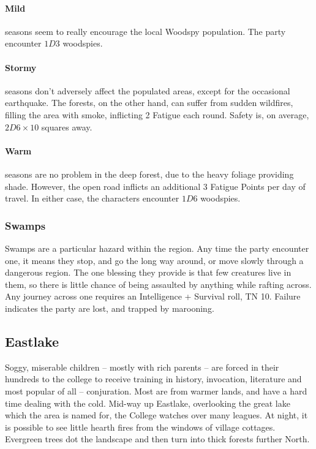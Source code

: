 \begin{multicols}{2}
\paragraph{Mild} seasons seem to really encourage the local Woodspy population.
The party encounter $1D3$ woodspies.
\paragraph{Stormy} seasons don't adversely affect the populated areas, except for the occasional earthquake.
The forests, on the other hand, can suffer from sudden wildfires, filling the area with smoke, inflicting 2 Fatigue each round.
Safety is, on average, $2D6 \times 10$ squares away.
\paragraph{Warm} seasons are no problem in the deep forest, due to the heavy foliage providing shade.
However, the open road inflicts an additional 3 Fatigue Points per day of travel.
In either case, the characters encounter $1D6$ woodspies.

\subsubsection{Swamps}

Swamps are a particular hazard within the region.
Any time the party encounter one, it means they stop, and go the long way around, or move slowly through a dangerous region.
The one blessing they provide is that few creatures live in them, so there is little chance of being assaulted by anything while rafting across.
Any journey across one requires an Intelligence + Survival roll, TN 10.
Failure indicates the party are lost, and trapped by marooning.

\subsection{Eastlake}


Soggy, miserable children -- mostly with rich parents -- are forced in their hundreds to the \gls{college} to receive training in history, invocation, literature and most popular of all -- conjuration.
Most are from warmer lands, and have a hard time dealing with the cold.
Mid-way up Eastlake, overlooking the great lake which the area is named for, the College watches over many leagues.
At night, it is possible to see little hearth fires from the windows of village cottages.
Evergreen trees dot the landscape and then turn into thick forests further North.


\end{multicols}
